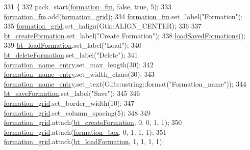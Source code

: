\begin{DoxyCode}
331                                        \{
332     pack\_start(\hyperlink{class_strategy_g_u_i_a1e0acda1bb4132bcb704eaf3bb0434f2}{formation\_fm}, \textcolor{keyword}{false}, \textcolor{keyword}{true}, 5);
333     \hyperlink{class_strategy_g_u_i_a1e0acda1bb4132bcb704eaf3bb0434f2}{formation\_fm}.add(\hyperlink{class_strategy_g_u_i_a86e01136167ad809807e6341957a850c}{formation\_grid});
334     \hyperlink{class_strategy_g_u_i_a1e0acda1bb4132bcb704eaf3bb0434f2}{formation\_fm}.set\_label(\textcolor{stringliteral}{"Formation"});
335     \hyperlink{class_strategy_g_u_i_a86e01136167ad809807e6341957a850c}{formation\_grid}.set\_halign(Gtk::ALIGN\_CENTER);
336 
337     \hyperlink{class_strategy_g_u_i_ab6edc11fb98709c98ad1815998aa937a}{bt\_createFormation}.set\_label(\textcolor{stringliteral}{"Create Formation"});
338     \hyperlink{class_strategy_g_u_i_a616a0f321878532cf85cfd02564758b5}{loadSavedFormations}();
339     \hyperlink{class_strategy_g_u_i_a89efee7959e39e3c993080d88262521d}{bt\_loadFormation}.set\_label(\textcolor{stringliteral}{"Load"});
340     \hyperlink{class_strategy_g_u_i_acce16be9100c9d09a3a9ca2087b8370b}{bt\_deleteFormation}.set\_label(\textcolor{stringliteral}{"Delete"});
341     \hyperlink{class_strategy_g_u_i_a19406b76eaf73c06545aa1c67c0636ce}{formation\_name\_entry}.set\_max\_length(30);
342     \hyperlink{class_strategy_g_u_i_a19406b76eaf73c06545aa1c67c0636ce}{formation\_name\_entry}.set\_width\_chars(30);
343     \hyperlink{class_strategy_g_u_i_a19406b76eaf73c06545aa1c67c0636ce}{formation\_name\_entry}.set\_text(Glib::ustring::format(\textcolor{stringliteral}{"Formation\_name"}));
344     \hyperlink{class_strategy_g_u_i_ae68d7475f55a82e46d74eb8b3cd53b9e}{bt\_saveFormation}.set\_label(\textcolor{stringliteral}{"Save"});
345 
346     \hyperlink{class_strategy_g_u_i_a86e01136167ad809807e6341957a850c}{formation\_grid}.set\_border\_width(10);
347     \hyperlink{class_strategy_g_u_i_a86e01136167ad809807e6341957a850c}{formation\_grid}.set\_column\_spacing(5);
348 
349     \hyperlink{class_strategy_g_u_i_a86e01136167ad809807e6341957a850c}{formation\_grid}.attach(\hyperlink{class_strategy_g_u_i_ab6edc11fb98709c98ad1815998aa937a}{bt\_createFormation}, 0, 0, 1, 1);
350     \hyperlink{class_strategy_g_u_i_a86e01136167ad809807e6341957a850c}{formation\_grid}.attach(\hyperlink{class_strategy_g_u_i_a0f2ab3a2cdca1663def9c4ec1e366a5d}{formation\_box}, 0, 1, 1, 1);
351     \hyperlink{class_strategy_g_u_i_a86e01136167ad809807e6341957a850c}{formation\_grid}.attach(\hyperlink{class_strategy_g_u_i_a89efee7959e39e3c993080d88262521d}{bt\_loadFormation}, 1, 1, 1, 1);

\end{DoxyCode}
